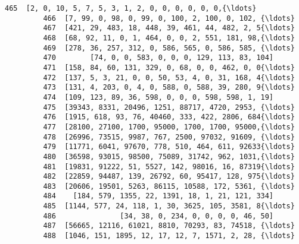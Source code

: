 \documentclass[11pt]{article}
\begin{document}
\begin{Verbatim}[commandchars=\\\{\}]
         465  [2, 0, 10, 5, 7, 5, 3, 1, 2, 0, 0, 0, 0, 0, 0,{\ldots}   
         466  [7, 99, 0, 98, 0, 99, 0, 100, 2, 100, 0, 102, {\ldots}   
         467  [421, 29, 483, 18, 448, 39, 461, 44, 482, 2, 5{\ldots}   
         468  [68, 92, 11, 0, 1, 464, 0, 0, 2, 551, 181, 98,{\ldots}   
         469  [278, 36, 257, 312, 0, 586, 565, 0, 586, 585, {\ldots}   
         470        [74, 0, 0, 583, 0, 0, 0, 129, 113, 83, 104]   
         471  [158, 84, 60, 131, 329, 0, 68, 0, 0, 462, 0, 0{\ldots}   
         472  [137, 5, 3, 21, 0, 0, 50, 53, 4, 0, 31, 168, 4{\ldots}   
         473  [131, 4, 203, 0, 4, 0, 588, 0, 588, 39, 280, 9{\ldots}   
         474  [109, 123, 89, 36, 598, 0, 0, 0, 598, 598, 1, 19]   
         475  [39343, 8331, 20496, 1251, 88717, 4720, 2953, {\ldots}   
         476  [1915, 618, 93, 76, 40460, 333, 422, 2806, 684{\ldots}   
         477  [28100, 27100, 1700, 95000, 1700, 1700, 95000,{\ldots}   
         478  [26996, 73515, 9987, 767, 2500, 97032, 91609, {\ldots}   
         479  [11771, 6041, 97670, 778, 510, 464, 611, 92633{\ldots}   
         480  [36598, 93015, 98500, 75089, 31742, 962, 1031,{\ldots}   
         481  [19831, 91222, 51, 5527, 142, 98016, 16, 87319{\ldots}   
         482  [22859, 94487, 139, 26792, 60, 95417, 128, 975{\ldots}   
         483  [20606, 19501, 5263, 86115, 10588, 172, 5361, {\ldots}   
         484    [184, 579, 1355, 22, 1391, 18, 1, 21, 121, 334]   
         485  [1144, 577, 24, 118, 1, 30, 3625, 105, 3581, 8{\ldots}   
         486               [34, 38, 0, 234, 0, 0, 0, 0, 46, 50]   
         487  [56665, 12116, 61021, 8810, 70293, 83, 74518, {\ldots}   
         488  [1046, 151, 1895, 12, 17, 12, 7, 1571, 2, 28, {\ldots}   
         

\end{Verbatim}
\end{document}
